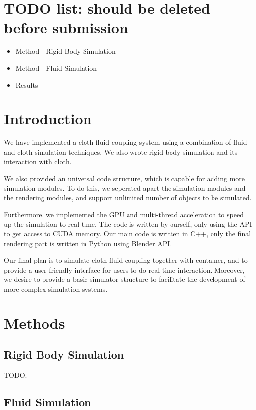 \section{TODO list: should be deleted before submission}

\begin{itemize}
\item Method - Rigid Body Simulation
\item Method - Fluid Simulation
\item Results
\end{itemize}

\section{Introduction}

We have implemented a cloth-fluid coupling system using a combination of fluid and cloth simulation techniques. We also wrote rigid body simulation and its interaction with cloth. 

We also provided an universal code structure, which is capable for adding more simulation modules. To do this, we seperated apart the simulation modules and the rendering modules, and support unlimited number of objects to be simulated.

Furthermore, we implemented the GPU and multi-thread acceleration to speed up the simulation to real-time. The code is written by ourself, only using the API to get access to CUDA memory. Our main code is written in C++, only the final rendering part is written in Python using Blender API.

Our final plan is to simulate cloth-fluid coupling together with container, and to provide a user-friendly interface for users to do real-time interaction. Moreover, we desire to provide a basic simulator structure to facilitate the development of more complex simulation systems.
\section{Methods}

\subsection{Rigid Body Simulation}

TODO.

\subsection{Fluid Simulation}

